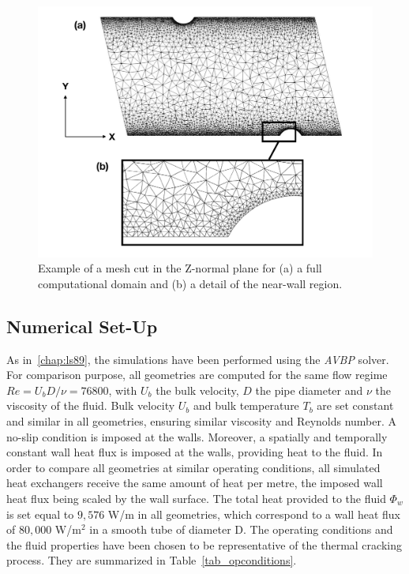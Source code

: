 \begin{figure}[ht]
\centering
\includegraphics[width=\linewidth]{fig/applications/optim/mert_mesh2.pdf}
\caption{Example of a mesh cut in the Z-normal plane for (a) a full computational domain and (b) a detail of the near-wall region.}
\label{mesh}
\end{figure}

\subsection{Numerical Set-Up}

As in~\cref{chap:ls89}, the simulations have been performed using the \emph{AVBP} solver. For comparison purpose, all geometries are computed for the same flow regime $Re = U_b D / \nu = 76800$, with $U_b$ the bulk velocity, $D$ the pipe diameter and $\nu$ the viscosity of the fluid. Bulk velocity $U_b$ and bulk temperature $T_b$ are set constant and similar in all geometries, ensuring similar viscosity and Reynolds number. A no-slip condition is imposed at the walls. Moreover, a spatially and temporally constant wall heat flux is imposed at the walls, providing heat to the fluid. In order to compare all geometries at similar operating conditions, all simulated heat exchangers receive the same amount of heat per metre, the imposed wall heat flux being scaled by the wall surface. The total heat provided to the fluid $\Phi_w$ is set equal to $9,576$ W/m in all geometries, which correspond to a wall heat flux of $80,000$ W/m$^2$ in a smooth tube of diameter D. The operating conditions and the fluid properties have been chosen to be representative of the thermal cracking process. They are summarized in Table~\ref{tab_opconditions}.

